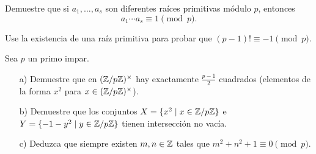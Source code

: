 \documentclass{article}
\begin{document}
\begin{problema}[Gauss]
  Demuestre que si $a_1, \ldots, a_s$ son diferentes raíces primitivas módulo
  $p$, entonces
  $$a_1 \cdots a_s \equiv 1 \pmod{p}.$$
\end{problema}

\begin{problema}
  Use la existencia de una raíz primitiva para probar que
  $(p-1)! \equiv -1 \pmod{p}$.
\end{problema}

\begin{problema}
  Sea $p$ un primo impar.

  \begin{enumerate}
  \item[a)] Demuestre que en $(\mathbb{Z}/p\mathbb{Z})^\times$ hay exactamente $\frac{p-1}{2}$
    cuadrados (elementos de la forma $x^2$ para $x \in (\mathbb{Z}/p\mathbb{Z})^\times$).

  \item[b)] Demuestre que los conjuntos $X = \{ x^2 \mid x \in \mathbb{Z}/p\mathbb{Z} \}$ e
    $Y = \{ -1-y^2 \mid y \in \mathbb{Z}/p\mathbb{Z} \}$ tienen intersección no vacía.

  \item[c)] Deduzca que siempre existen $m,n \in \mathbb{Z}$ tales que
    $m^2 + n^2 + 1 \equiv 0 \pmod{p}$.
  \end{enumerate}
\end{problema}
\end{document}
